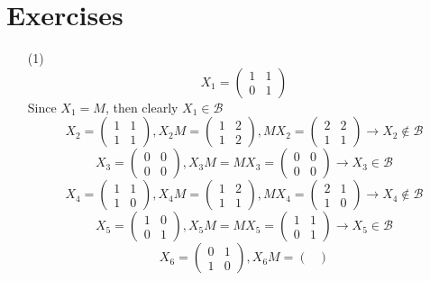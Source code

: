 \documentclass[12pt]{article}
\begin{document}
\section*{Exercises}
\begin{itemize}
\item[(1)]
$$X_1 = \begin{pmatrix}
1 & 1 \\
0 & 1
\end{pmatrix}$$
Since $X_1 = M$, then clearly $X_1 \in \mathcal{B}$
$$X_2 = \begin{pmatrix}
1 & 1 \\
1 & 1
\end{pmatrix}, X_2M = \begin{pmatrix}
1 & 2 \\
1 & 2
\end{pmatrix}, MX_2 = \begin{pmatrix}
2 & 2 \\
1 & 1
\end{pmatrix} \rightarrow X_2 \not \in \mathcal{B}$$
$$X_3 = \begin{pmatrix}
0 & 0 \\
0 & 0
\end{pmatrix}, X_3M = MX_3 = \begin{pmatrix}
0 & 0 \\
0 & 0
\end{pmatrix} \rightarrow X_3 \in \mathcal{B}$$
$$X_4 = \begin{pmatrix}
1 & 1 \\
1 & 0
\end{pmatrix}, X_4M = \begin{pmatrix}
1 & 2 \\
1 & 1
\end{pmatrix}, MX_4 = \begin{pmatrix}
2 & 1 \\
1 & 0
\end{pmatrix} \rightarrow X_4 \not \in \mathcal{B}$$
$$X_5 = \begin{pmatrix}
1 & 0 \\
0 & 1
\end{pmatrix}, X_5M = MX_5 = \begin{pmatrix}
1 & 1 \\
0 & 1
\end{pmatrix} \rightarrow X_5 \in \mathcal{B}$$
$$X_6 = \begin{pmatrix}
0 & 1 \\
1 & 0
\end{pmatrix}, X_6M = \begin{pmatrix}

\end{pmatrix}$$
\end{itemize}
\end{document}
